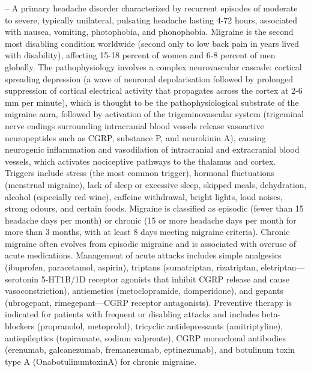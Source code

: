 -- A primary headache disorder characterized by recurrent episodes of moderate to severe, typically unilateral, pulsating headache lasting 4-72 hours, associated with nausea, vomiting, photophobia, and phonophobia. Migraine is the second most disabling condition worldwide (second only to low back pain in years lived with disability), affecting 15-18 percent of women and 6-8 percent of men globally. The pathophysiology involves a complex neurovascular cascade: cortical spreading depression (a wave of neuronal depolarisation followed by prolonged suppression of cortical electrical activity that propagates across the cortex at 2-6 mm per minute), which is thought to be the pathophysiological substrate of the migraine aura, followed by activation of the trigeminovascular system (trigeminal nerve endings surrounding intracranial blood vessels release vasoactive neuropeptides such as CGRP, substance P, and neurokinin A), causing neurogenic inflammation and vasodilation of intracranial and extracranial blood vessels, which activates nociceptive pathways to the thalamus and cortex. Triggers include stress (the most common trigger), hormonal fluctuations (menstrual migraine), lack of sleep or excessive sleep, skipped meals, dehydration, alcohol (especially red wine), caffeine withdrawal, bright lights, loud noises, strong odours, and certain foods. Migraine is classified as episodic (fewer than 15 headache days per month) or chronic (15 or more headache days per month for more than 3 months, with at least 8 days meeting migraine criteria). Chronic migraine often evolves from episodic migraine and is associated with overuse of acute medications. Management of acute attacks includes simple analgesics (ibuprofen, paracetamol, aspirin), triptans (sumatriptan, rizatriptan, eletriptan—serotonin 5-HT1B/1D receptor agonists that inhibit CGRP release and cause vasoconstriction), antiemetics (metoclopramide, domperidone), and gepants (ubrogepant, rimegepant—CGRP receptor antagonists). Preventive therapy is indicated for patients with frequent or disabling attacks and includes beta-blockers (propranolol, metoprolol), tricyclic antidepressants (amitriptyline), antiepileptics (topiramate, sodium valproate), CGRP monoclonal antibodies (erenumab, galcanezumab, fremanezumab, eptinezumab), and botulinum toxin type A (OnabotulinumtoxinA) for chronic migraine.

